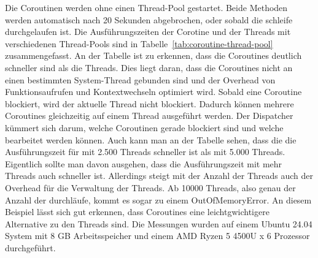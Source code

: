 \documentclass[11pt]{article}
\begin{document}
    Die Coroutinen werden ohne einen Thread-Pool gestartet.
    Beide Methoden werden automatisch nach 20 Sekunden abgebrochen, oder sobald die schleife durchgelaufen ist.
    Die Ausführungszeiten der Corotine und der Threads mit verschiedenen Thread-Pools sind in Tabelle~\ref{tab:coroutine-thread-pool} zusammengefasst.
    An der Tabelle ist zu erkennen, dass die Coroutines deutlich schneller sind als die Threads.
    Dies liegt daran, dass die Coroutines nicht an einen bestimmten System-Thread gebunden sind und der Overhead von Funktionsaufrufen und Kontextwechseln optimiert wird.
    Sobald eine Coroutine blockiert, wird der aktuelle Thread nicht blockiert.
    Dadurch können mehrere Coroutines gleichzeitig auf einem Thread ausgeführt werden.
    Der Dispatcher kümmert sich darum, welche Coroutinen gerade blockiert sind und welche bearbeitet werden können.
    Auch kann man an der Tabelle sehen, dass die die Ausführungszeit für mit 2.500 Threads schneller ist als mit 5.000 Threads.
    Eigentlich sollte man davon ausgehen, dass die Ausführungszeit mit mehr Threads auch schneller ist.
    Allerdings steigt mit der Anzahl der Threads auch der Overhead für die Verwaltung der Threads.
    Ab 10000 Threads, also genau der Anzahl der durchläufe, kommt es sogar zu einem OutOfMemoryError.
    An diesem Beispiel lässt sich gut erkennen, dass Coroutines eine leichtgwichtigere Alternative zu den Threads sind.
    Die Messungen wurden auf einem Ubuntu 24.04 System mit 8 GB Arbeitsspeicher und einem AMD Ryzen 5 4500U x 6 Prozessor durchgeführt.
\end{document}
